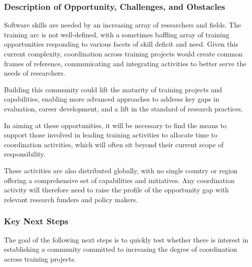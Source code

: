 \subsubsection{Description of Opportunity, Challenges, and Obstacles}

Software skills are needed by an increasing array of researchers and fields. The
training arc is not well-defined, with a sometimes baffling array of training
opportunities responding to various facets of skill deficit and need. Given this
current complexity, coordination across training projects would create common
frames of reference, communicating and integrating activities to better serve
the needs of researchers.

Building this community could lift the maturity of training projects and
capabilities, enabling more advanced approaches to address key gaps in
evaluation, career development, and a lift in the standard of research
practices.

In aiming at these opportunities, it will be necessary to find the means to
support those involved in leading training activities to allocate time to
coordination activities, which will often sit beyond their current scope of
responsibility.

These activities are also distributed globally, with no single country or region
offering a comprehensive set of capabilities and initiatives. Any coordination
activity will therefore need to raise the profile of the opportunity gap with
relevant research funders and policy makers.

\subsubsection{Key Next Steps}

The goal of the following next steps is to quickly test whether there is
interest in establishing a community committed to increasing the degree of
coordination across training projects.

